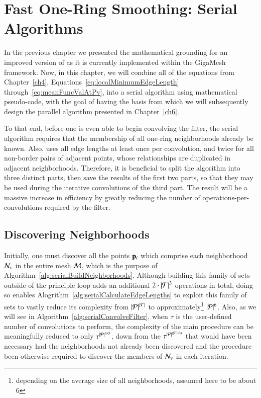 \chapter{Fast One-Ring Smoothing: Serial Algorithms}
\label{ch5}
In the previous chapter we presented the mathematical grounding for an improved version of  as it is currently implemented within the GigaMesh framework. Now, in this chapter, we will combine all of the equations from Chapter~\ref{ch4}, Equations~\ref{eq:localMinimumEdgeLength} through~\ref{eq:meanFuncValAtPv}, into a serial algorithm using mathematical pseudo-code, with the goal of having the basis from which we will subsequently design the parallel algorithm presented in Chapter~\ref{ch6}.

To that end, before one is even able to begin convolving the filter, the serial algorithm requires that the membership of all one-ring neighborhoods already be known. Also,  uses all edge lengths at least once per convolution, and twice for all non-border pairs of adjacent points, whose relationships are duplicated in adjacent neighborhoods. Therefore, it is beneficial to split the algorithm into three distinct parts, then save the results of the first two parts, so that they may be used during the iterative convolutions of the third part. The result will be a massive increase in efficiency by greatly reducing the number of operations-per-convolutions required by the filter.

%
%
%
%
\section{Discovering Neighborhoods}
\label{ch5sDN}
Initially, one must discover all the points $\mathbf{p}_i$ which comprise each neighborhood $\mathcal{N}_v$ in the entire mesh $\mathcal{M}$, which is the purpose of Algorithm~\ref{alg:serialBuildNeighborhoods}. Although building this family of sets outside of the principle loop adds an additional $2\cdot |\mathcal{T}|^3$ operations in total, doing so enables Alogrithm~\ref{alg:serialCalculateEdgeLengths} to exploit this family of sets to vastly reduce its complexity from $|\mathcal{P}|^{|\mathcal{T}|}$ to approximately\footnote{depending on the average size of all neighborhoods, assumed here to be about 6} $|\mathcal{P}|^6$. Also, as we will see in Algorithm~\ref{alg:serialConvolveFilter}, when $\tau$ is the user-defined number of convolutions to perform, the complexity of the main procedure can be meaningfully reduced to only $\tau^{|\mathcal{P}|^{6*3}}$, down from the $\tau^{|\mathcal{P}|^{(|\mathcal{F}|*3)}}$ that would have been necessary had the neighborhoods not already been discovered and the procedure been otherwise required to discover the members of $\mathcal{N}_v$ in each iteration.%
%


